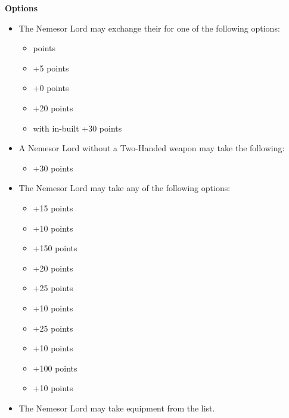 \begin{minipage}[t]{0.72\textwidth}
	\vspace*{2em}
	\textbf{Options}
	\begin{itemize}
		\item The Nemesor Lord may exchange their  for one of the following options:
		\begin{itemize}			
			\item {}  points
			\item {} \dotfill +5 points
			\item {} \dotfill +0 points
			\item {} \dotfill +20 points
			\item {} with in-built  \dotfill +30 points
		\end{itemize}
		\item A Nemesor Lord without a Two-Handed weapon may take the following:
		\begin{itemize}
			\item {} \dotfill +30 points
		\end{itemize}
		\item The Nemesor Lord may take any of the following options:
		\begin{itemize}
			\item {} \dotfill +15 points
			\item {} \dotfill +10 points
			\item {} \dotfill +150 points
			\item {} \dotfill +20 points
			\item {} \dotfill +25 points
			\item {} \dotfill +10 points
			\item {} \dotfill +25 points
			\item {} \dotfill +10 points
			\item {} \dotfill +100 points
			\item {} \dotfill +10 points
		\end{itemize}
		\item The Nemesor Lord may take equipment from the  list.
	\end{itemize}
\end{minipage}
